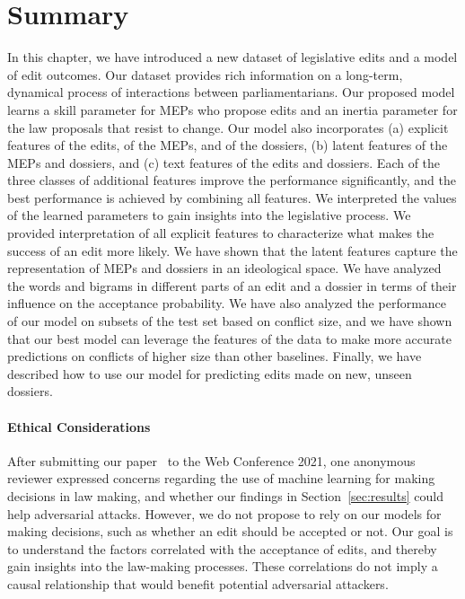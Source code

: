 \section{Summary}
\label{sec:conclusion}

In this chapter, we have introduced a new dataset of legislative edits and a model of edit outcomes.
Our dataset provides rich information on a long-term, dynamical process of interactions between parliamentarians.
Our proposed model learns a skill parameter for MEPs who propose edits and an inertia parameter for the law proposals that resist to change.
Our model also incorporates (a) explicit features of the edits, of the MEPs, and of the dossiers, (b) latent features of the MEPs and dossiers, and (c) text features of the edits and dossiers.
Each of the three classes of additional features improve the performance significantly, and the best performance is achieved by combining all features.
We interpreted the values of the learned parameters to gain insights into the legislative process.
We provided interpretation of all explicit features to characterize what makes the success of an edit more likely.
We have shown that the latent features capture the representation of MEPs and dossiers in an ideological space.
We have analyzed the words and bigrams in different parts of an edit and a dossier in terms of their influence on the acceptance probability.
We have also analyzed the performance of our model on subsets of the test set based on conflict size, and we have shown that our best model can leverage the features of the data to make more accurate predictions on conflicts of higher size than other baselines.
Finally, we have described how to use our model for predicting edits made on new, unseen dossiers.

\paragraph{Ethical Considerations}
After submitting our paper~\citep{kristof2021war} to the Web Conference 2021, one anonymous reviewer expressed concerns regarding the use of machine learning for making decisions in law making, and whether our findings in Section~\ref{sec:results} could help adversarial attacks.
However, we do not propose to rely on our models for making decisions, such as whether an edit should be accepted or not.
Our goal is to understand the factors correlated with the acceptance of edits, and thereby gain insights into the law-making processes.
These correlations do not imply a causal relationship that would benefit potential adversarial attackers.

